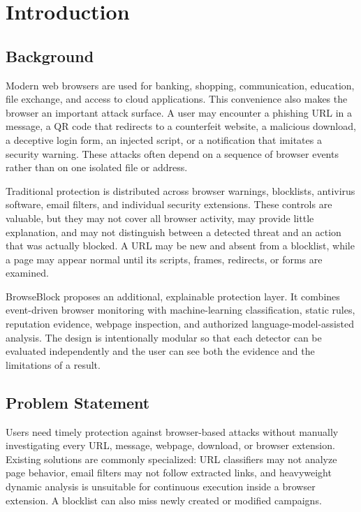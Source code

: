 \setcounter{equation}{0}
\chapter{Introduction}
\sloppy

\section{Background}
Modern web browsers are used for banking, shopping, communication, education,
file exchange, and access to cloud applications. This convenience also makes the
browser an important attack surface. A user may encounter a phishing URL in a
message, a QR code that redirects to a counterfeit website, a malicious download,
a deceptive login form, an injected script, or a notification that imitates a
security warning. These attacks often depend on a sequence of browser events rather
than on one isolated file or address.

Traditional protection is distributed across browser warnings, blocklists, antivirus
software, email filters, and individual security extensions. These controls are
valuable, but they may not cover all browser activity, may provide little explanation,
and may not distinguish between a detected threat and an action that was actually
blocked. A URL may be new and absent from a blocklist, while a page may appear
normal until its scripts, frames, redirects, or forms are examined.

BrowseBlock proposes an additional, explainable protection layer. It combines
event-driven browser monitoring with machine-learning classification, static rules,
reputation evidence, webpage inspection, and authorized language-model-assisted
analysis. The design is intentionally modular so that each detector can be evaluated
independently and the user can see both the evidence and the limitations of a result.

\section{Problem Statement}
Users need timely protection against browser-based attacks without manually
investigating every URL, message, webpage, download, or browser extension. Existing
solutions are commonly specialized: URL classifiers may not analyze page behavior,
email filters may not follow extracted links, and heavyweight dynamic analysis is
unsuitable for continuous execution inside a browser extension. A blocklist can also
miss newly created or modified campaigns.

